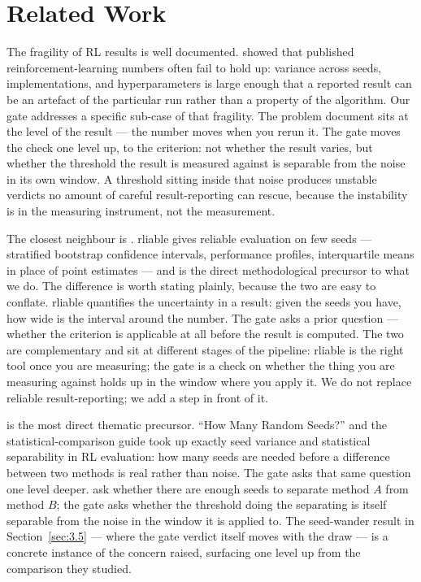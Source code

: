 \documentclass{article}
\begin{document}
\section{Related Work}
\label{sec:related}

The fragility of RL results is well documented. \citet{henderson2018deep} showed
that published reinforcement-learning numbers often fail to hold up: variance
across seeds, implementations, and hyperparameters is large enough that a
reported result can be an artefact of the particular run rather than a property
of the algorithm. Our gate addresses a specific sub-case of that fragility. The
problem \citet{henderson2018deep} document sits at the level of the result ---
the number moves when you rerun it. The gate moves the check one level up, to
the criterion: not whether the result varies, but whether the threshold the
result is measured against is separable from the noise in its own window. A
threshold sitting inside that noise produces unstable verdicts no amount of
careful result-reporting can rescue, because the instability is in the measuring
instrument, not the measurement.

The closest neighbour is \citet{agarwal2021deep}. rliable gives reliable
evaluation on few seeds --- stratified bootstrap confidence intervals,
performance profiles, interquartile means in place of point estimates --- and
is the direct methodological precursor to what we do. The difference is worth
stating plainly, because the two are easy to conflate. rliable quantifies the
uncertainty in a result: given the seeds you have, how wide is the interval
around the number. The gate asks a prior question --- whether the criterion is
applicable at all before the result is computed. The two are complementary and
sit at different stages of the pipeline: rliable is the right tool once you are
measuring; the gate is a check on whether the thing you are measuring against
holds up in the window where you apply it. We do not replace reliable
result-reporting; we add a step in front of it.

\citet{colas2018howmany} is the most direct thematic precursor. ``How Many
Random Seeds?'' and the statistical-comparison guide \citep{colas2019hitchhiker}
took up exactly seed variance and statistical separability in RL evaluation: how
many seeds are needed before a difference between two methods is real rather
than noise. The gate asks that same question one level deeper.
\citet{colas2018howmany} ask whether there are enough seeds to separate method
$A$ from method $B$; the gate asks whether the threshold doing the separating is
itself separable from the noise in the window it is applied to. The seed-wander
result in Section~\ref{sec:3.5} --- where the gate verdict itself moves with the
draw --- is a concrete instance of the concern \citet{colas2018howmany} raised,
surfacing one level up from the comparison they studied.
\end{document}

